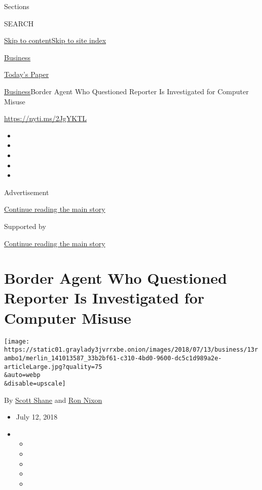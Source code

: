 Sections

SEARCH

\protect\hyperlink{site-content}{Skip to
content}\protect\hyperlink{site-index}{Skip to site index}

\href{https://www.nytimes3xbfgragh.onion/section/business}{Business}

\href{https://myaccount.nytimes3xbfgragh.onion/auth/login?response_type=cookie\&client_id=vi}{}

\href{https://www.nytimes3xbfgragh.onion/section/todayspaper}{Today's
Paper}

\href{/section/business}{Business}\textbar{}Border Agent Who Questioned
Reporter Is Investigated for Computer Misuse

\url{https://nyti.ms/2JgYKTL}

\begin{itemize}
\item
\item
\item
\item
\item
\end{itemize}

Advertisement

\protect\hyperlink{after-top}{Continue reading the main story}

Supported by

\protect\hyperlink{after-sponsor}{Continue reading the main story}

\hypertarget{border-agent-who-questioned-reporter-is-investigated-for-computer-misuse}{%
\section{Border Agent Who Questioned Reporter Is Investigated for
Computer
Misuse}\label{border-agent-who-questioned-reporter-is-investigated-for-computer-misuse}}

\texttt{[image: https://static01.graylady3jvrrxbe.onion/images/2018/07/13/business/13rambo1/merlin\_141013587\_33b2bf61-c310-4bd0-9600-dc5c1d989a2e-articleLarge.jpg?quality=75\\\&auto=webp\\\&disable=upscale]}

By \href{https://www.nytimes3xbfgragh.onion/by/scott-shane}{Scott Shane}
and \href{https://www.nytimes3xbfgragh.onion/by/ron-nixon}{Ron Nixon}

\begin{itemize}
\item
  July 12, 2018
\item
  \begin{itemize}
  \item
  \item
  \item
  \item
  \item
  \end{itemize}
\end{itemize}

